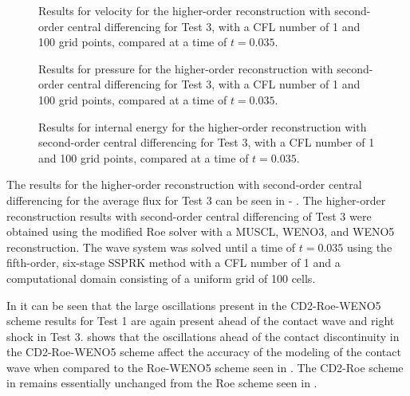 \begin{figure}
	\caption[Results for velocity for the higher-order reconstruction with second-order central differencing for Test 3, with a CFL number of 1 and 100 grid points, compared at a time of $t=0.035$.]{Results for velocity for the higher-order reconstruction with second-order central differencing for Test 3, with a CFL number of 1 and 100 grid points, compared at a time of $t=0.035$.}
	\label{fig:Test4HORCD2velocity}
\end{figure}

\begin{figure}
	\caption[Results for pressure for the higher-order reconstruction with second-order central differencing for Test 3, with a CFL number of 1 and 100 grid points, compared at a time of $t=0.035$.]{Results for pressure for the higher-order reconstruction with second-order central differencing for Test 3, with a CFL number of 1 and 100 grid points, compared at a time of $t=0.035$.}
	\label{fig:Test4HORCD2pressure}
\end{figure}

\begin{figure}
	\caption[Results for internal energy for the higher-order reconstruction with second-order central differencing for Test 3, with a CFL number of 1 and 100 grid points, compared at a time of $t=0.035$.]{Results for internal energy for the higher-order reconstruction with second-order central differencing for Test 3, with a CFL number of 1 and 100 grid points, compared at a time of $t=0.035$.}
	\label{fig:Test4HORCD2energy}
\end{figure}
The results for the higher-order reconstruction with second-order central differencing for the average flux for Test 3 can be seen in  - . The higher-order reconstruction results with second-order central differencing of Test 3 were obtained using the modified Roe solver with a MUSCL, WENO3, and WENO5 reconstruction. The wave system was solved until a time of $t=0.035$ using the fifth-order, six-stage SSPRK method with a CFL number of 1 and a computational domain consisting of a uniform grid of 100 cells.

In  it can be seen that the large oscillations present in the CD2-Roe-WENO5 scheme results for Test 1 are again present ahead of the contact wave and right shock in Test 3.  shows that the oscillations ahead of the contact discontinuity in the CD2-Roe-WENO5 scheme affect the accuracy of the modeling of the contact wave when compared to the Roe-WENO5 scheme seen in . The CD2-Roe scheme in  remains essentially unchanged from the Roe scheme seen in .

